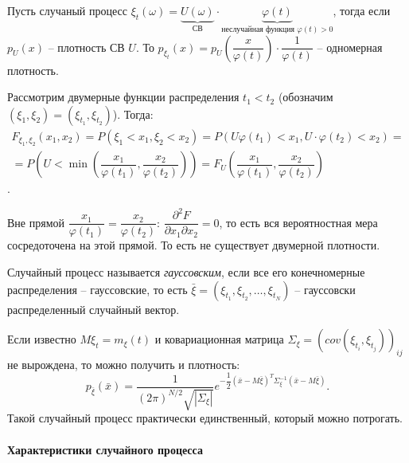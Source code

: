 \begin{ex}
  Пусть случаный процесс $\xi_t (\omega) = \underbrace{U(\omega)}_\text{СВ} \cdot \underbrace{\varphi(t)}_\text{неслучайная функция $\varphi(t) > 0$}$, тогда если $p_U (x)$ -- плотность СВ $U$.
  То $p_{\xi_t} (x) = p_U \left(\dfrac{x}{\varphi(t)}\right) \cdot \dfrac{1}{\varphi(t)}$ --
  одномерная плотность.

  Рассмотрим двумерные функции распределения $t_1 < t_2$
  (обозначим $(\xi_1, \xi_2) = (\xi_{t_1}, \xi_{t_2})$). Тогда:
  \begin{multline*}
    F_{\xi_1, \xi_2} (x_1, x_2) = P(\xi_1 < x_1, \xi_2 < x_2)
    = P\left(U\varphi(t_1) < x_1, U\cdot\varphi(t_2) < x_2\right) = \\
    = P\left(U < \min \left(\dfrac{x_1}{\varphi(t_1)}, \dfrac{x_2}{\varphi(t_2)}\right)\right)
    = F_U \left( \dfrac{x_1}{\varphi(t_1)}, \dfrac{x_2}{\varphi(t_2)} \right)
  \end{multline*}
  .

  Вне прямой $\dfrac{x_1}{\varphi(t_1)} = \dfrac{x_2}{\varphi(t_2)}$:
  $ \dfrac{\partial^2 F}{\partial x_1 \partial x_2} = 0$, то есть вся вероятностная
  мера сосредоточена на этой прямой. То есть не существует двумерной плотности.
\end{ex}

\begin{definition}
  Случайный процесс называется \emph{гауссовским}, если все его конечномерные распределения
  -- гауссовские, то есть $\bar\xi = (\xi_{t_1}, \xi_{t_2}, \dots, \xi_{t_N})$ --
  гауссовски распределенный случайный вектор.
\end{definition}

Если известно $M\xi_t = m_\xi (t)$ и ковариационная матрица
$\Sigma_\xi = \left(cov(\xi_{t_i}, \xi_{t_j})\right)_{ij}$ не вырождена,
то можно получить и плотность:
\[
  p_{\bar{\xi}} (\bar{x}) = \dfrac{1}{(2\pi)^{N/2} \sqrt{|\Sigma_\xi|}} e^{ -\dfrac{1}{2} (\bar{x} - M\bar{\xi})^T \Sigma^{-1}_\xi (\bar{x} - M\bar{\xi}) }.
\]
Такой случайный процесс практически единственный, который можно потрогать.

\paragraph{Характеристики случайного процесса}

